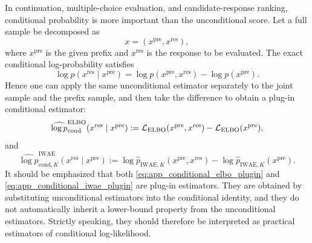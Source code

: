 In continuation, multiple-choice evaluation, and candidate-response ranking, conditional probability is more important than the unconditional score. Let a full sample be decomposed as
\begin{equation}
x=(x^{\mathrm{pre}},x^{\mathrm{res}}),
\label{eq:app_prefix_response_partition}
\end{equation}
where $x^{\mathrm{pre}}$ is the given prefix and $x^{\mathrm{res}}$ is the response to be evaluated. The exact conditional log-probability satisfies
\begin{equation}
\log p(x^{\mathrm{res}}\mid x^{\mathrm{pre}})
=
\log p(x^{\mathrm{pre}},x^{\mathrm{res}})
-
\log p(x^{\mathrm{pre}}).
\label{eq:app_conditional_identity}
\end{equation}
Hence one can apply the same unconditional estimator separately to the joint sample and the prefix sample, and then take the difference to obtain a plug-in conditional estimator:
\begin{equation}
\widehat{\log p}_{\mathrm{cond}}^{\mathrm{ELBO}}(x^{\mathrm{res}}\mid x^{\mathrm{pre}})
:=
\mathcal{L}_{\mathrm{ELBO}}(x^{\mathrm{pre}},x^{\mathrm{res}})
-
\mathcal{L}_{\mathrm{ELBO}}(x^{\mathrm{pre}}),
\label{eq:app_conditional_elbo_plugin}
\end{equation}
and
\begin{equation}
\widehat{\log p}_{\mathrm{cond},K}^{\mathrm{IWAE}}(x^{\mathrm{res}}\mid x^{\mathrm{pre}})
:=
\log \widehat p_{\mathrm{IWAE},K}(x^{\mathrm{pre}},x^{\mathrm{res}})
-
\log \widehat p_{\mathrm{IWAE},K}(x^{\mathrm{pre}}).
\label{eq:app_conditional_iwae_plugin}
\end{equation}
It should be emphasized that both \eqref{eq:app_conditional_elbo_plugin} and \eqref{eq:app_conditional_iwae_plugin} are plug-in estimators. They are obtained by substituting unconditional estimators into the conditional identity, and they do not automatically inherit a lower-bound property from the unconditional estimators. Strictly speaking, they should therefore be interpreted as practical estimators of conditional log-likelihood.

